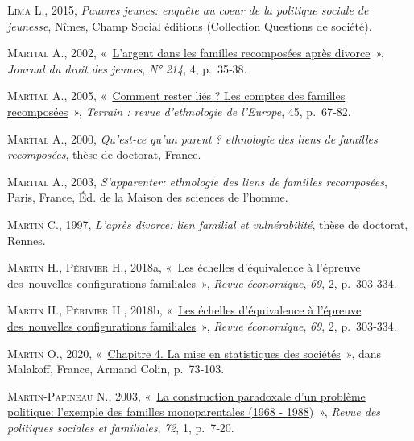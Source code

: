 \documentclass[
  12pt,
]{book}
\newlength{\cslhangindent}
\newenvironment{CSLReferences}[2] %
 {\begin{list}{}{%
  \setlength{\itemindent}{0pt}
  \setlength{\leftmargin}{0pt}
  \setlength{\parsep}{0pt}
  \ifodd #1
   \setlength{\leftmargin}{\cslhangindent}
   \setlength{\itemindent}{-1\cslhangindent}
  \fi
  \setlength{\itemsep}{#2\baselineskip}}}
 {\end{list}}
\begin{document}
\begin{CSLReferences}{0}{1}
\textsc{Lima L.}, 2015, \emph{Pauvres jeunes: enquête au coeur de la
politique sociale de jeunesse}, Nîmes, Champ Social éditions (Collection
Questions de société).

\textsc{Martial A.}, 2002,
{«~\href{http://www.cairn.info/revue-journal-du-droit-des-jeunes-2002-4-page-35.htm}{L'argent
dans les familles recomposées après divorce}~»}, \emph{Journal du droit
des jeunes}, \emph{N° 214}, 4, p.~35‑38.

\textsc{Martial A.}, 2005,
{«~\href{https://doi.org/10.4000/terrain.3550}{Comment rester liés ? Les
comptes des familles recomposées}~»}, \emph{Terrain : revue d'ethnologie
de l'Europe}, 45, p.~67‑82.

\textsc{Martial A.}, 2000, \emph{Qu'est-ce qu'un parent ? ethnologie des
liens de familles recomposées}, thèse de doctorat, France.

\textsc{Martial A.}, 2003, \emph{S'apparenter: ethnologie des liens de
familles recomposées}, Paris, France, Éd. de la Maison des sciences de
l'homme.

\textsc{Martin C.}, 1997, \emph{L'après divorce: lien familial et
vulnérabilité}, thèse de doctorat, Rennes.

\textsc{Martin H.}, \textsc{Périvier H.}, 2018a,
{«~\href{https://doi.org/10.3917/reco.pr2.0114}{Les échelles
d{'}équivalence à l{'}épreuve des~nouvelles configurations
familiales}~»}, \emph{Revue économique}, \emph{69}, 2, p.~303‑334.

\textsc{Martin H.}, \textsc{Périvier H.}, 2018b,
{«~\href{https://doi.org/10.3917/reco.pr2.0114}{Les échelles
d{'}équivalence à l{'}épreuve des~nouvelles configurations
familiales}~»}, \emph{Revue économique}, \emph{69}, 2, p.~303‑334.

\textsc{Martin O.}, 2020,
{«~\href{https://www.cairn.info/l-empire-des-chiffres--9782200625719-page-73.htm}{Chapitre
4. La mise en statistiques des sociétés}~»}, dans Malakoff, France,
Armand Colin, p.~73‑103.

\textsc{Martin-Papineau N.}, 2003,
{«~\href{https://doi.org/10.3406/caf.2003.1983}{La construction
paradoxale d{'}un problème politique: l{'}exemple des familles
monoparentales (1968 - 1988)}~»}, \emph{Revue des politiques sociales et
familiales}, \emph{72}, 1, p.~7‑20.


\end{CSLReferences}
\end{document}
